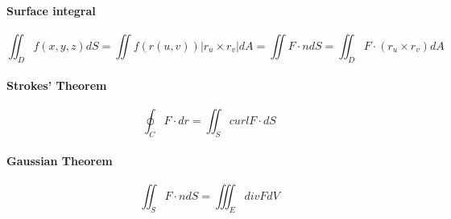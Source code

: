 \documentclass[12pt]{article}
\begin{document}
\paragraph{Surface integral}
\[\iint_D f(x, y, z)dS = \iint f(r(u, v))|r_u \times r_v|dA = \iint F\cdot n dS = \iint_D F \cdot (r_u \times r_v)dA\]

\paragraph{Strokes' Theorem}
\[\oint_C F \cdot dr = \iint_S curl F \cdot dS\]

\paragraph{Gaussian Theorem}
\[\iint_S F \cdot n dS = \iiint_E div FdV\]
\end{document}
